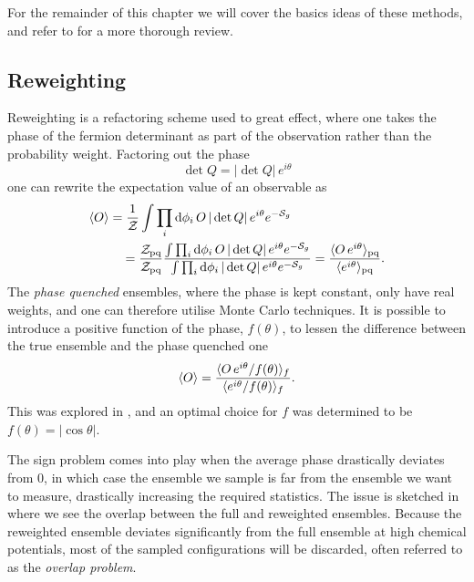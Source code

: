 For the remainder of this chapter we will cover the basics ideas of these
methods, and refer to \citep{deForcrand:2010ys} for a more thorough review.

\subsection{Reweighting}

Reweighting is a refactoring scheme used to great effect, where one takes the
phase of the fermion determinant as part of the observation rather than the
probability weight. Factoring out the phase
%
\begin{equation}
  \det Q = |\det Q| \, e^{i\theta}
\end{equation}
%
one can rewrite the expectation value of an observable as
%
\begin{align}
  \langle O \rangle  &=
  \frac{1}{\mathcal{Z}}\int \prod_i \mathrm{d} \phi_i \, O \, | \det
    Q | \, e^{i \theta} e^{-\mathcal{S}_g} \nonumber\\
  & \hskip1em = \frac{\mathcal{Z}_{\text{pq}}}{\mathcal{Z}_{\text{pq}}}
  \frac{\int \prod_i \mathrm{d} \phi_i \, O \, | \det
    Q | \, e^{i \theta} e^{-\mathcal{S}_g}}{%
  \int \prod_i \mathrm{d} \phi_i \, | \det
    Q | \, e^{i \theta} e^{-\mathcal{S}_g}}
  = \frac{\langle O \, e^{i\theta} \rangle_{\text{pq}}}{\langle e^{i\theta} \rangle_{\text{pq}}} .
\end{align}
%
The \emph{phase quenched} ensembles, where the phase is kept constant, only have
real weights, and one can therefore utilise Monte Carlo techniques. It is
possible to introduce a positive function of the phase, $f(\theta)$, to lessen
the difference between the true ensemble and the phase quenched one
%
\begin{equation}
  \langle O \rangle
  = \frac{\langle O \, e^{i\theta} / f(\theta) \rangle_f}{%
    \langle e^{i\theta} / f(\theta) \rangle_f} .
\end{equation}
%
This was explored in \citep{deForcrand:2002pa}, and an optimal choice for $f$
was determined to be $f(\theta) = |\cos\theta|$.

The sign problem comes into play when the average phase drastically deviates
from $0$, in which case the ensemble we sample is far from the ensemble we
want to measure, drastically increasing the required statistics. The issue is
sketched in  where we see the overlap between
the full and reweighted ensembles. Because the reweighted ensemble deviates
significantly from the full ensemble at high chemical potentials, most of the
sampled configurations will be discarded, often referred to as the \emph{overlap
  problem}.

